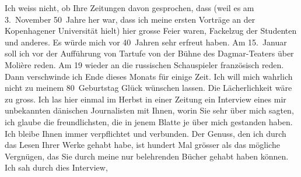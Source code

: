 \begin{ledgroupsized}[t]{13cm}
           \pstart
           Ich weiss nicht, ob Ihre Zeitungen davon gesprochen, dass (weil es am
                  3. November 50 Jahre her war, dass ich meine ersten Vorträge an der
                  Kopenhagener Universität hielt) hier grosse
               Feier waren, Fackelzug der Studenten {\pb}und anderes. Es würde mich vor
               40 Jahren sehr erfreut haben.\pend
           \pstart
           Am 15. Januar soll ich vor der Aufführung von Tartufe von der Bühne des Dagmar-Teaters über Molière reden. Am
                  19 wieder an die russischen
               Schauspieler französisch reden.\pend
           \pstart
           Dann verschwinde ich Ende dieses Monats für einige Zeit. Ich will mich wahrlich nicht
               zu meinem 80 Geburtstag Glück wünschen lassen. Die Lächerlichkeit wäre zu gross.\pend
           \pstart
           Ich las hier einmal im Herbst in einer Zeitung ein Interview eines mir unbekannten { }dänischen Journalisten mit
               Ihnen, worin Sie sehr \label{K_L02373-2v}\label{K_L02373-2h} über
               mich sagten, ich glaube die freundlichsten, die in jenem Blatte je über mich
               gestanden haben.\pend
           \pstart
           Ich bleibe Ihnen immer verpflichtet und {\pb}verbunden. Der Genuss, den ich
               durch das Lesen Ihrer Werke gehabt habe, ist hundert Mal grösser als das mögliche
               Vergnügen, das Sie durch meine nur belehrenden Bücher gehabt haben können.\pend
           \pstart
           Ich sah durch dies Interview,

\end{ledgroupsized}
